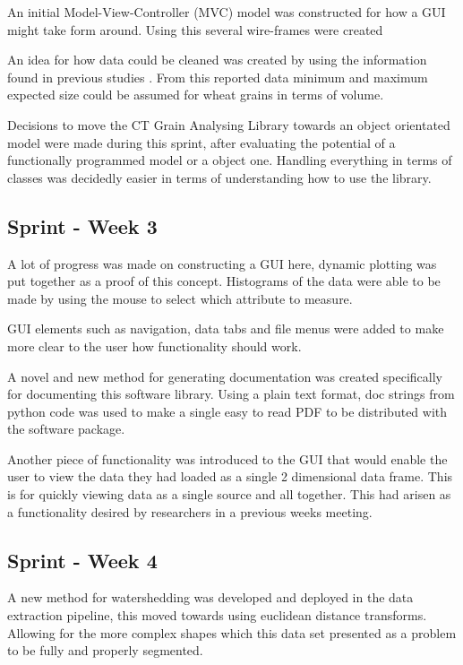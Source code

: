 \documentclass[11pt]{report}
\begin{document}
An initial Model-View-Controller (MVC) model was constructed for how a GUI might take form around. Using this several wire-frames were created

An idea for how data could be cleaned was created by using the information found in previous studies \cite{Hughes2017}. From this reported data minimum and maximum expected size could be assumed for wheat grains in terms of volume.

Decisions to move the CT Grain Analysing Library towards an object orientated model were made during this sprint, after evaluating the potential of a functionally programmed model or a object one. Handling everything in terms of classes was decidedly easier in terms of understanding how to use the library.

\subsection{Sprint - Week 3}
\label{sec:org0b4a825}

A lot of progress was made on constructing a GUI here, dynamic plotting was put together as a proof of this concept. Histograms of the data were able to be made by using the mouse to select which attribute to measure.

GUI elements such as navigation, data tabs and file menus were added to make more clear to the user how functionality should work.

A novel and new method for generating documentation was created specifically for documenting this software library. Using a plain text format, doc strings from python code was used to make a single easy to read PDF to be distributed with the software package.

Another piece of functionality was introduced to the GUI that would enable the user to view the data they had loaded as a single 2 dimensional data frame. This is for quickly viewing data as a single source and all together. This had arisen as a functionality desired by researchers in a previous weeks meeting.

\subsection{Sprint - Week 4}
\label{sec:org836dff2}
A new method for watershedding was developed and deployed in the data extraction pipeline, this moved towards using euclidean distance transforms. Allowing for the more complex shapes which this data set presented as a problem to be fully and properly segmented.
\end{document}
